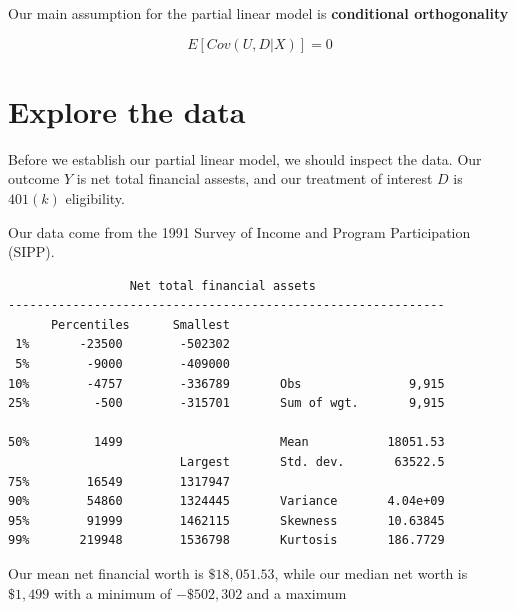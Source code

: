 \documentclass[
]{book}
\newenvironment{Shaded}{\begin{snugshade}}{\end{snugshade}}
\newcommand{\CommentTok}[1]{\textcolor[rgb]{0.56,0.35,0.01}{\textit{#1}}}
\newcommand{\DataTypeTok}[1]{\textcolor[rgb]{0.13,0.29,0.53}{#1}}
\newcommand{\KeywordTok}[1]{\textcolor[rgb]{0.13,0.29,0.53}{\textbf{#1}}}
\newcommand{\NormalTok}[1]{#1}
\newcommand{\OtherTok}[1]{\textcolor[rgb]{0.56,0.35,0.01}{#1}}
\begin{document}
Our main assumption for the partial linear model is \textbf{conditional orthogonality}

\[ E[Cov(U,D|X)]=0 \]

\section{Explore the data}\label{explore-the-data}

Before we establish our partial linear model, we should inspect the data. Our outcome \(Y\) is net total financial assests, and our treatment of interest \(D\) is \(401(k)\) eligibility.

Our data come from the 1991 Survey of Income and Program Participation (SIPP).

\begin{Shaded}
\end{Shaded}

\begin{verbatim}
                 Net total financial assets
-------------------------------------------------------------
      Percentiles      Smallest
 1%       -23500        -502302
 5%        -9000        -409000
10%        -4757        -336789       Obs               9,915
25%         -500        -315701       Sum of wgt.       9,915

50%         1499                      Mean           18051.53
                        Largest       Std. dev.       63522.5
75%        16549        1317947
90%        54860        1324445       Variance       4.04e+09
95%        91999        1462115       Skewness       10.63845
99%       219948        1536798       Kurtosis       186.7729
\end{verbatim}

Our mean net financial worth is \(\$18,051.53\), while our median net worth is \(\$1,499\) with a minimum of \(-\$502,302\) and a maximum
\end{document}
